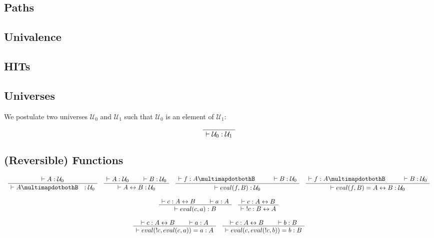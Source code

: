\documentclass[format=acmlarge,review,natbib]{acmart}
\newcommand{\invc}[1]{!#1}
\newcommand{\evalone}[2]{eval(#1,#2)}
\newcommand{\iso}{\leftrightarrow}
\newcommand{\piso}{\multimapdotbothB~~}
\newcommand{\uzero}{\mathcal{U}_0}
\newcommand{\uone}{\mathcal{U}_1}
\newcommand{\proves}{\vdash}
\newcommand{\jdg}[3]{#1 \proves #2 : #3}
\begin{document}
\subsection{Paths}

\subsection{Univalence}

\subsection{HITs}

\newpage

\subsection{Universes}

We postulate two universes $\uzero$ and $\uone$ such that $\uzero$ is an element
of $\uone$:

\[
  \AxiomC{}
  \UnaryInfC{$\jdg{}{\uzero}{\uone}$}
  \DisplayProof
\]

\subsection{(Reversible) Functions}

\[
  \begin{array}{c}
    \AxiomC{$\jdg{}{A}{\uzero}$}
    \UnaryInfC{$\jdg{}{A\piso}{\uzero}$}
    \DisplayProof
    \quad
    \AxiomC{$\jdg{}{A}{\uzero}$}
    \AxiomC{$\jdg{}{B}{\uzero}$}
    \BinaryInfC{$\jdg{}{A\iso B}{\uzero}$}
    \DisplayProof
    \quad
    \AxiomC{$\jdg{}{f}{A \piso}$}
    \AxiomC{$\jdg{}{B}{\uzero}$}
    \BinaryInfC{$\jdg{}{\evalone{f}{B}}{\uzero}$}
    \DisplayProof
    \quad
    \AxiomC{$\jdg{}{f}{A \piso}$}
    \AxiomC{$\jdg{}{B}{\uzero}$}
    \BinaryInfC{$\jdg{}{\evalone{f}{B} = A \iso B}{\uzero}$}
    \DisplayProof
    \\
    \\
    \AxiomC{$\jdg{}{c}{A \iso B}$}
    \AxiomC{$\jdg{}{a}{A}$}
    \BinaryInfC{$\jdg{}{\evalone{c}{a}}{B}$}
    \DisplayProof
    \quad
    \AxiomC{$\jdg{}{c}{A \iso B}$}
    \UnaryInfC{$\jdg{}{\;\invc{c}}{B \iso A}$}
    \DisplayProof
    \\
    \\
    \AxiomC{$\jdg{}{c}{A \iso B}$}
    \AxiomC{$\jdg{}{a}{A}$}
    \BinaryInfC{$\jdg{}{\evalone{\invc{c}}{\evalone{c}{a}} = a}{A}$}
    \DisplayProof
    \quad
    \AxiomC{$\jdg{}{c}{A \iso B}$}
    \AxiomC{$\jdg{}{b}{B}$}
    \BinaryInfC{$\jdg{}{\evalone{c}{\evalone{\invc{c}}{b}} = b}{B}$}
    \DisplayProof
  \end{array}
\]
\end{document}
